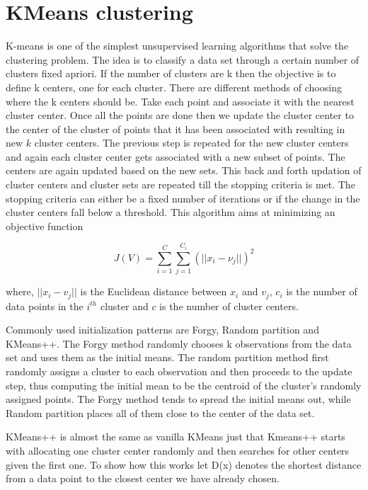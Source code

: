 \documentclass{book}
\begin{document}
\section{KMeans clustering}%
K-means is one of the simplest unsupervised learning algorithms that solve the clustering problem. The idea is to classify a data set through a certain number of clusters fixed apriori. If the number of clusters are k then the objective is to define k centers, one for each cluster. There are different methods of choosing where the k centers should be. Take each point and associate it with the nearest cluster center. Once all the points are done then we update the cluster center to the center of the cluster of points that it has been associated with resulting in new $k$ cluster centers. The previous step is repeated for the new cluster centers and again each cluster center gets associated with a new subset of points. The centers are again updated based on the new sets. This back and forth updation of cluster centers and cluster sets are repeated till the stopping criteria is met. The stopping criteria can either be a fixed number of iterations or if the change in the cluster centers fall below a threshold. This algorithm aims at minimizing an objective function

\begin{equation}
	J(V) = \sum_{i=1}^{C}\sum_{j=1}^{C_i}(||x_i - \nu_j||)^2
\end{equation}

where, $||x_i - v_j||$ is the Euclidean distance between $x_i$ and $v_j$, $c_i$ is the number of data points in the $i^{th}$ cluster and $c$ is the number of cluster centers.

Commonly used initialization patterns are Forgy, Random partition and KMeans++. The Forgy method randomly chooses k observations from the data set and uses them as the initial means. The random partition method first randomly assigns a cluster to each observation and then proceeds to the update step, thus computing the initial mean to be the centroid of the cluster's randomly assigned points. The Forgy method tends to spread the initial means out, while Random partition places all of them close to the center of the data set.

KMeans++ is almost the same as vanilla KMeans just that Kmeans++ starts with allocating one cluster center randomly and then searches for other centers given the first one. To show how this works let D(x) denotes the shortest distance from a data point to the closest center we have already chosen\cite{UL:10}.
\end{document}

